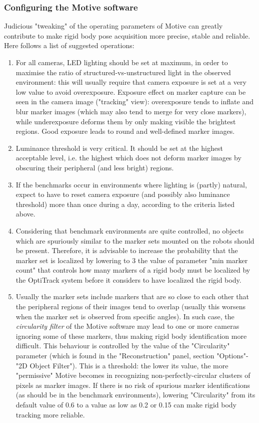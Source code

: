 \documentclass[a4paper]{article}
\begin{document}
\subsubsection{Configuring the Motive software}
\label{mocap_config}
Judicious "tweaking" of the operating parameters of Motive can greatly contribute to make rigid body pose acquisition more precise, stable and reliable. Here follows a list of suggested operations:
\begin{enumerate}
\item  For all cameras, LED lighting should be set at maximum, in order to maximise the ratio of structured-vs-unstructured light in the observed environment: this will usually require that camera exposure is set at a very low value to avoid overexposure. Exposure effect on marker capture can be seen in the camera image ("tracking" view): overexposure tends to inflate and blur marker images (which may also tend to merge for very close markers), while underexposure deforms them by only making visible the brightest regions. Good exposure leads to round and well-defined marker images.
\item Luminance threshold is very critical. It should be set at the highest acceptable level, i.e. the highest which does not deform marker images by obscuring their peripheral (and less bright) regions.
\item If the benchmarks occur in environments where lighting is (partly) natural, expect to have to reset camera exposure (and possibly also luminance threshold) more than once during a day, according to the criteria listed above.
\item Considering that benchmark environments are quite controlled, no objects which are spuriously similar to the marker sets mounted on the robots should be present. Therefore, it is advisable to increase the probability that the marker set is localized by lowering to 3 the value of parameter "min marker count" that controls how many markers of a rigid body must be localized by the OptiTrack system before it considers to have localized the rigid body.
\item Usually the marker sets include markers that are so close to each other that the peripheral regions of their images tend to overlap (usually this worsens when the marker set is observed from specific angles). In such case, the \textit{circularity filter} of the Motive software may lead to one or more cameras ignoring some of these markers, thus making rigid body identification more difficult. This behaviour is controlled by the value of the "Circularity" parameter (which is found in the "Reconstruction" panel, section "Options"-"2D Object Filter"). This is a threshold: the lower its value, the more "permissive" Motive becomes in recognizing non-perfectly-circular clusters of pixels as marker images. If there is no risk of spurious marker identifications (as should be in the benchmark environments), lowering "Circularity" from its default value of 0.6 to a value as low as 0.2 or 0.15 can make rigid body tracking more reliable.

\end{enumerate}
\end{document}

